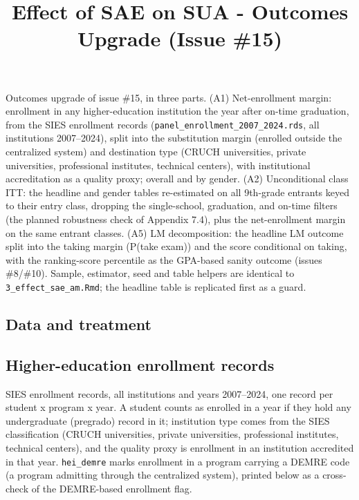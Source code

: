 \documentclass[
]{article}
\title{Effect of SAE on SUA - Outcomes Upgrade (Issue \#15)}
\author{}
\date{\vspace{-2.5em}}
\begin{document}
\maketitle

Outcomes upgrade of issue \#15, in three parts. (A1) Net-enrollment
margin: enrollment in any higher-education institution the year after
on-time graduation, from the SIES enrollment records
(\texttt{panel\_enrollment\_2007\_2024.rds}, all institutions
2007--2024), split into the substitution margin (enrolled outside the
centralized system) and destination type (CRUCH universities, private
universities, professional institutes, technical centers), with
institutional accreditation as a quality proxy; overall and by gender.
(A2) Unconditional class ITT: the headline and gender tables
re-estimated on all 9th-grade entrants keyed to their entry class,
dropping the single-school, graduation, and on-time filters (the planned
robustness check of Appendix 7.4), plus the net-enrollment margin on the
same entrant classes. (A5) LM decomposition: the headline LM outcome
split into the taking margin (P(take exam)) and the score conditional on
taking, with the ranking-score percentile as the GPA-based sanity
outcome (issues \#8/\#10). Sample, estimator, seed and table helpers are
identical to \texttt{3\_effect\_sae\_am.Rmd}; the headline table is
replicated first as a guard.

\hypertarget{data-and-treatment}{%
\subsection{Data and treatment}\label{data-and-treatment}}

\hypertarget{higher-education-enrollment-records}{%
\subsection{Higher-education enrollment
records}\label{higher-education-enrollment-records}}

SIES enrollment records, all institutions and years 2007--2024, one
record per student x program x year. A student counts as enrolled in a
year if they hold any undergraduate (pregrado) record in it; institution
type comes from the SIES classification (CRUCH universities, private
universities, professional institutes, technical centers), and the
quality proxy is enrollment in an institution accredited in that year.
\texttt{hei\_demre} marks enrollment in a program carrying a DEMRE code
(a program admitting through the centralized system), printed below as a
cross-check of the DEMRE-based enrollment flag.
\end{document}

